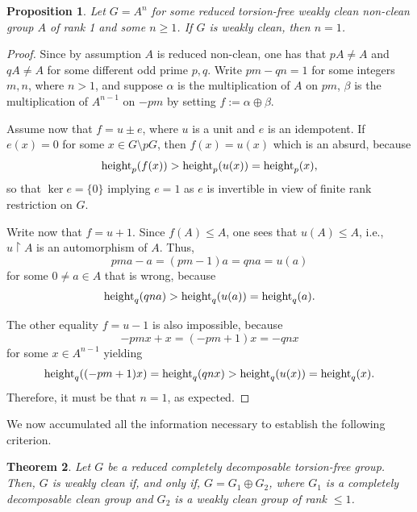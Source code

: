 \documentclass{amsart}
\newtheorem{theorem}{Theorem}[section]
\newtheorem{proposition}[theorem]{Proposition}
\theoremstyle{definition}
\theoremstyle{remark}
\numberwithin{equation}{section}
\begin{document}
\begin{proposition}\label{rankone}
Let $G=A^n$ for some reduced torsion-free weakly clean non-clean group $A$ of rank 1 and some $n\geq 1$. If $G$ is weakly clean, then $n=1$.
\end{proposition}

\begin{proof} Since by assumption $A$ is reduced non-clean, one has that $pA\neq A$ and $qA\neq A$ for some different odd prime $p,q$. Write $pm-qn=1$ for some integers $m,n$, where $n>1$, and suppose $\alpha$ is the multiplication of $A$ on $pm$, $\beta$ is the multiplication of $A^{n-1}$ on $-pm$ by setting $f:=\alpha\oplus\beta$.

Assume now that $f=u\pm e$, where $u$ is a unit and $e$ is an idempotent. If $e(x)=0$ for some $x\in G\setminus pG$, then $f(x)=u(x)$ which is an absurd, because $${\rm height}_p(f(x))>{\rm height}_p(u(x))={\rm height}_p(x),$$ so that $\ker e=\{0\}$ implying $e=1$ as $e$ is invertible in view of finite rank restriction on $G$.

Write now that $f=u+1$. Since $f(A)\leq A$, one sees that $u(A)\leq A$, i.e., $u\!\upharpoonright\!A$ is an  automorphism of $A$. Thus, $$pma-a=(pm-1)a=qna=u(a)$$ for some $0\neq a\in A$ that is wrong, because $${\rm height}_q(qna)>{\rm height}_q(u(a))={\rm height}_q(a).$$

The other equality $f=u-1$ is also impossible, because $$-pmx+x=(-pm+1)x=-qnx$$ for some $x\in A^{n-1}$ yielding $${\rm height}_q((-pm+1)x)={\rm height}_q(qnx)>{\rm height}_q(u(x))={\rm height}_q(x).$$ Therefore, it must be that $n=1$, as expected.
\end{proof}

We now accumulated all the information necessary to establish the following criterion.

\begin{theorem}\label{redcomp}
Let $G$ be a reduced completely decomposable torsion-free group. Then, $G$ is weakly clean if, and only if, $G=G_1\oplus G_2$, where $G_1$ is a completely decomposable clean group and $G_2$ is a weakly clean group of
rank $\leq 1$.
\end{theorem}
\end{document}
